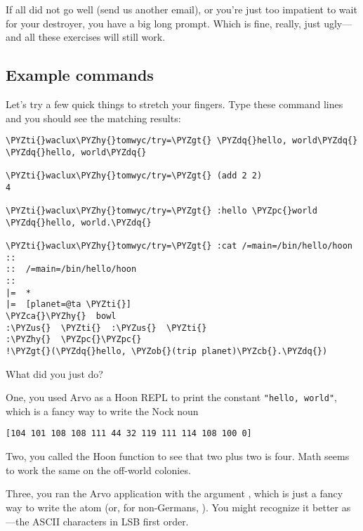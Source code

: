 If all did not go well (send us another email), or you're just
too impatient to wait for your destroyer, you have a big long
prompt.  Which is fine, really, just ugly---and all these
exercises will still work.

\subsection{Example commands}

Let's try a few quick things to stretch your fingers.  Type these
command lines and you should see the matching results:

\begin{framed_shaded}
\begin{Verbatim}[fontsize=\relsize{-2.5},fontseries=b,commandchars=\\\{\}]
\PYZti{}waclux\PYZhy{}tomwyc/try=\PYZgt{} \PYZdq{}hello, world\PYZdq{}
\PYZdq{}hello, world\PYZdq{}

\PYZti{}waclux\PYZhy{}tomwyc/try=\PYZgt{} (add 2 2)
4

\PYZti{}waclux\PYZhy{}tomwyc/try=\PYZgt{} :hello \PYZpc{}world
\PYZdq{}hello, world.\PYZdq{}

\PYZti{}waclux\PYZhy{}tomwyc/try=\PYZgt{} :cat /=main=/bin/hello/hoon
::
::  /=main=/bin/hello/hoon
::
|=  *
|=  [planet=@ta \PYZti{}]
\PYZca{}\PYZhy{}  bowl
:\PYZus{}  \PYZti{}  :\PYZus{}  \PYZti{}
:\PYZhy{}  \PYZpc{}\PYZpc{}
!\PYZgt{}(\PYZdq{}hello, \PYZob{}(trip planet)\PYZcb{}.\PYZdq{})
\end{Verbatim}
\end{framed_shaded}

What did you just do?

One, you used Arvo as a Hoon REPL to print the constant {\tt "hello,
world"}, which is a fancy way to write the Nock noun

\begin{framed_shaded}
\begin{Verbatim}[fontsize=\relsize{-2.5},fontseries=b,commandchars=\\\{\}]
[104 101 108 108 111 44 32 119 111 114 108 100 0]
\end{Verbatim}
\end{framed_shaded}

Two, you called the Hoon  function to see that two plus two
is four.  Math seems to work the same on the off-world colonies.

Three, you ran the Arvo application  with the argument
, which is just a fancy way to write the atom
 (or, for non-Germans, ).  You
might recognize it better as ---the ASCII
characters in LSB first order.


